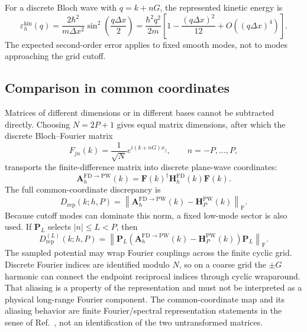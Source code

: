 For a discrete Bloch wave with $q=k+nG$, the represented kinetic energy is
\begin{equation}
    \varepsilon_h^{\mathrm{kin}}(q)
    =
    \frac{2\hbar^2}{m\Delta x^2}
    \sin^2\left(\frac{q\Delta x}{2}\right)
    =
    \frac{\hbar^2q^2}{2m}
    \left[1-\frac{(q\Delta x)^2}{12}
    +O\!\left((q\Delta x)^4\right)\right].
    \label{eq:periodic-1d-fd-dispersion}
\end{equation}
The expected second-order error applies to fixed smooth modes, not to modes
approaching the grid cutoff.

\subsection{Comparison in common coordinates}

Matrices of different dimensions or in different bases cannot be subtracted
directly. Choosing $N=2P+1$ gives equal matrix dimensions, after which the
discrete Bloch--Fourier matrix
\begin{equation}
    F_{jn}(k)
    =\frac{1}{\sqrt N}e^{i(k+nG)x_j},
    \qquad n=-P,\ldots,P,
\end{equation}
transports the finite-difference matrix into discrete plane-wave coordinates:
\begin{equation}
    \mathbf A_h^{\mathrm{FD}\rightarrow\mathrm{PW}}(k)
    =
    \mathbf F(k)^\dagger
    \mathbf H_h^{\mathrm{FD}}(k)
    \mathbf F(k).
\end{equation}
The full common-coordinate discrepancy is
\begin{equation}
    D_{\mathrm{rep}}(k;h,P)
    =
    \left\lVert
        \mathbf A_h^{\mathrm{FD}\rightarrow\mathrm{PW}}(k)
        -\mathbf H_P^{\mathrm{PW}}(k)
    \right\rVert_{\mathrm F}.
\end{equation}
Because cutoff modes can dominate this norm, a fixed low-mode sector is also
used. If $\mathbf P_L$ selects $|n|\leq L<P$, then
\begin{equation}
    D_{\mathrm{rep}}^{(L)}(k;h,P)
    =
    \left\lVert
        \mathbf P_L
        \left(
            \mathbf A_h^{\mathrm{FD}\rightarrow\mathrm{PW}}(k)
            -\mathbf H_P^{\mathrm{PW}}(k)
        \right)
        \mathbf P_L
    \right\rVert_{\mathrm F}.
    \label{eq:periodic-1d-common-discrepancy}
\end{equation}
The sampled potential may wrap Fourier couplings across the finite cyclic grid.
Discrete Fourier indices are identified modulo $N$, so on a coarse grid the
$\pm G$ harmonic can connect the endpoint reciprocal indices through cyclic
wraparound. That aliasing is a property of the representation and must not be
interpreted as a physical long-range Fourier component. The common-coordinate map and
its aliasing behavior are finite Fourier/spectral representation statements in the
sense of Ref.~\cite{trefethen2000}, not an identification of the two untransformed
matrices.

